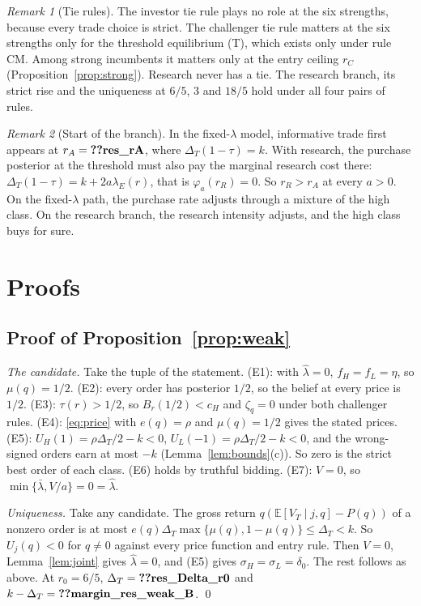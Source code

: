 \documentclass[12pt]{article}
\theoremstyle{definition}
\theoremstyle{remark}
\newtheorem{remark}{Remark}
\newcommand{\E}{\mathbb E}
\newcommand{\DT}{\Delta_T}
\newcommand{\lh}{\hat\lambda}
\newcommand{\lb}{\bar\lambda}
\begin{document}
\begin{remark}[Tie rules]\label{rem:ties}
The investor tie rule plays no role at the six strengths, because every trade choice is strict. The challenger tie
rule matters at the six strengths only for the threshold equilibrium (T), which exists only under rule CM. Among
strong incumbents it matters only at the entry ceiling $r_C$ (Proposition~\ref{prop:strong}). Research never has a
tie. The research branch, its strict rise and the uniqueness at $6/5$, $3$ and $18/5$ hold under all four pairs of
rules.
\end{remark}

\begin{remark}[Start of the branch]\label{rem:start}
In the fixed-$\lambda$ model, informative trade first appears at $r_A=\reg{res_rA}$, where $\DT(1-\tau)=k$. With
research, the purchase posterior at the threshold must also pay the marginal research cost there:
$\DT(1-\tau)=k+2a\lambda_E(r)$, that is $\varphi_a(r_R)=0$. So $r_R>r_A$ at every $a>0$. On the fixed-$\lambda$
path, the purchase rate adjusts through a mixture of the high class. On the research branch, the research intensity
adjusts, and the high class buys for sure.
\end{remark}

\section{Proofs}\label{sec:proofs}

\subsection{Proof of Proposition~\ref{prop:weak}}

\emph{The candidate.} Take the tuple of the statement. (E1): with $\lh=0$, $f_H=f_L=\eta$, so $\mu(q)=1/2$. (E2):
every order has posterior $1/2$, so the belief at every price is $1/2$. (E3): $\tau(r)>1/2$, so
$B_r(1/2)<c_H$ and $\zeta_q=0$ under both challenger rules. (E4): \eqref{eq:price} with $e(q)=\rho$ and
$\mu(q)=1/2$ gives the stated prices. (E5): $U_H(1)=\rho\DT/2-k<0$,
$U_L(-1)=\rho\DT/2-k<0$, and the wrong-signed orders earn at most $-k$ (Lemma~\ref{lem:bounds}(c)). So zero is the
strict best order of each class. (E6) holds by truthful bidding. (E7): $V=0$, so $\min\{\lb,V/a\}=0=\lh$.

\emph{Uniqueness.} Take any candidate. The gross return $q(\E[V_T\mid j,q]-P(q))$ of a nonzero order is at most
$e(q)\DT\max\{\mu(q),1-\mu(q)\}\le\DT<k$. So $U_j(q)<0$ for $q\neq0$ against every price function and entry rule.
Then $V=0$, Lemma~\ref{lem:joint} gives $\lh=0$, and (E5) gives $\sigma_H=\sigma_L=\delta_0$. The rest follows as
above. At $r_0=6/5$, $\DT=\reg{res_Delta_r0}$ and $k-\DT=\reg{margin_res_weak_B}$. \qed
\end{document}
